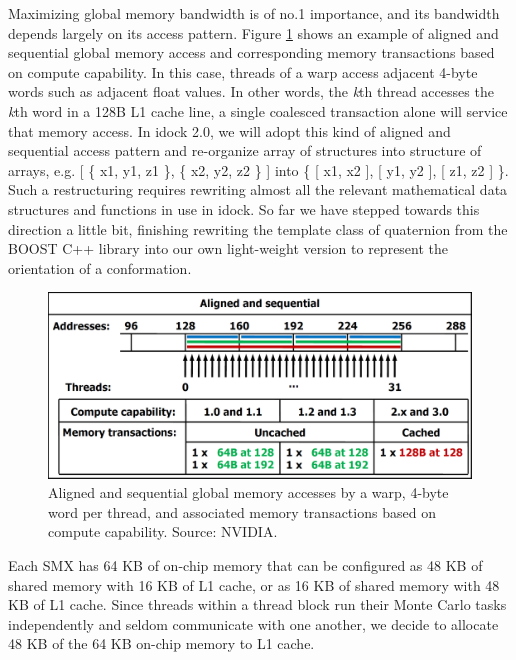 Maximizing global memory bandwidth is of no.1 importance, and its bandwidth depends largely on its access pattern. Figure \ref{GPU:AlignedSequentialGlobalMemoryAccess} shows an example of aligned and sequential global memory access and corresponding memory transactions based on compute capability. In this case, threads of a warp access adjacent 4-byte words such as adjacent float values. In other words, the \textit{k}th thread accesses the \textit{k}th word in a 128B L1 cache line, a single coalesced transaction alone will service that memory access. In idock 2.0, we will adopt this kind of aligned and sequential access pattern and re-organize array of structures into structure of arrays, e.g.  [ \{ x1, y1, z1 \}, \{ x2, y2, z2 \} ] into \{ [ x1, x2 ], [ y1, y2 ], [ z1, z2 ] \}. Such a restructuring requires rewriting almost all the relevant mathematical data structures and functions in use in idock. So far we have stepped towards this direction a little bit, finishing rewriting the template class of quaternion from the BOOST C++ library into our own light-weight version to represent the orientation of a conformation.

\begin{figure}
\centering
\includegraphics[width=\linewidth]{GPU/AlignedSequentialGlobalMemoryAccess.png}
\caption{Aligned and sequential global memory accesses by a warp, 4-byte word per thread, and associated memory transactions based on compute capability. Source: NVIDIA.}
\label{GPU:AlignedSequentialGlobalMemoryAccess}
\end{figure}

Each SMX has 64 KB of on-chip memory that can be configured as 48 KB of shared memory with 16 KB of L1 cache, or as 16 KB of shared memory with 48 KB of L1 cache. Since threads within a thread block run their Monte Carlo tasks independently and seldom communicate with one another, we decide to allocate 48 KB of the 64 KB on-chip memory to L1 cache.

